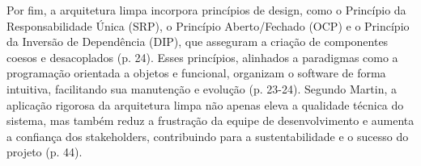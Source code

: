         \par Por fim, a arquitetura limpa incorpora princípios de design, como o Princípio da Responsabilidade Única (SRP), o Princípio Aberto/Fechado (OCP) e o Princípio da Inversão de Dependência (DIP), que asseguram a criação de componentes coesos e desacoplados (p. 24). Esses princípios, alinhados a paradigmas como a programação orientada a objetos e funcional, organizam o software de forma intuitiva, facilitando sua manutenção e evolução (p. 23-24). Segundo Martin, a aplicação rigorosa da arquitetura limpa não apenas eleva a qualidade técnica do sistema, mas também reduz a frustração da equipe de desenvolvimento e aumenta a confiança dos stakeholders, contribuindo para a sustentabilidade e o sucesso do projeto (p. 44).